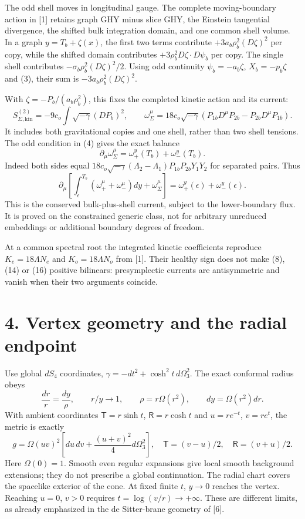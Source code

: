 \documentclass[
  11pt,
]{article}
\begin{document}
The odd shell moves in longitudinal gauge. The complete moving-boundary
action in {[}1{]} retains graph GHY minus slice GHY, the Einstein
tangential divergence, the shifted bulk integration domain, and one
common shell volume. In a graph \(y=T_b+\zeta(x)\), the first two terms
contribute \(+3a_b\rho_b^2(D\zeta)^2\) per copy, while the shifted
domain contributes \(+3\rho_b^2D\zeta\cdot D\psi_b\) per copy. The
single shell contributes \(-\sigma_b\rho_b^2(D\zeta)^2/2\). Using odd
continuity \(\psi_b=-a_b\zeta\), \(X_b=-p_b\zeta\) and (3), their sum is
\(-3a_b\rho_b^2(D\zeta)^2\).

With \(\zeta=-P_b/(a_b\rho_b^2)\), this fixes the completed kinetic
action and its current: \[
 S^{(2)}_{\Sigma,\mathrm{kin}}=-9c_o\int\sqrt{-\gamma}(DP_b)^2,
 \qquad
 \omega^\mu_\Sigma=18c_o\sqrt{-\gamma}
 (P_{1b}D^\mu P_{2b}-P_{2b}D^\mu P_{1b}).              \tag{14}
\] It includes both gravitational copies and one shell, rather than two
shell tensions. The odd condition in (4) gives the exact balance \[
 \partial_\mu\omega^\mu_\Sigma
 =\omega^y_+(T_b)+\omega^y_-(T_b).                     \tag{15}
\] Indeed both sides equal
\(18c_o\sqrt{-\gamma}(\Lambda_2-\Lambda_1)P_{1b}P_{2b}Y_1Y_2\) for
separated pairs. Thus \[
 \partial_\mu\left[\int_\epsilon^{T_b}
 (\omega^\mu_++\omega^\mu_-)dy+\omega^\mu_\Sigma\right]
 =\omega^y_+(\epsilon)+\omega^y_-(\epsilon).            \tag{16}
\] This is the conserved bulk-plus-shell current, subject to the
lower-boundary flux. It is proved on the constrained generic class, not
for arbitrary unreduced embeddings or additional boundary degrees of
freedom.

At a common spectral root the integrated kinetic coefficients reproduce
\(K_e=18\Lambda N_e\) and \(K_o=18\Lambda N_o\) from {[}1{]}. Their
healthy sign does not make (8), (14) or (16) positive bilinears:
presymplectic currents are antisymmetric and vanish when their two
arguments coincide.

\section{4. Vertex geometry and the radial
endpoint}\label{vertex-geometry-and-the-radial-endpoint}

Use global \(dS_4\) coordinates, \(\gamma=-dt^2+\cosh^2t\,d\Omega_3^2\).
The exact conformal radius obeys \[
 \frac{dr}{r}=\frac{dy}{\rho},\qquad r/y\to1,
 \qquad \rho=r\Omega(r^2),\qquad dy=\Omega(r^2)dr.
\] With ambient coordinates \(\mathsf T=r\sinh t\),
\(\mathsf R=r\cosh t\) and \(u=re^{-t}\), \(v=re^t\), the metric is
exactly \[
 g=\Omega(uv)^2\left[du\,dv+\frac{(u+v)^2}{4}d\Omega_3^2\right],
 \quad \mathsf T=(v-u)/2,\quad \mathsf R=(v+u)/2.        \tag{17}
\] Here \(\Omega(0)=1\). Smooth even regular expansions give local
smooth background extensions; they do not prescribe a global
continuation. The radial chart covers the spacelike exterior of the
cone. At fixed finite \(t\), \(y\to0\) reaches the vertex. Reaching
\(u=0\), \(v>0\) requires \(t=\log(v/r)\to+\infty\). These are different
limits, as already emphasized in the de Sitter-brane geometry of
{[}6{]}.
\end{document}
